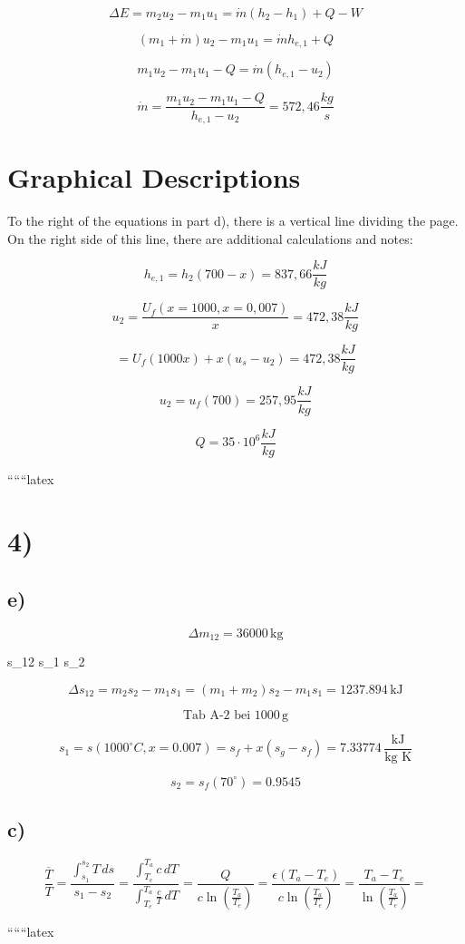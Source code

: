 \[
\Delta E = m_2 u_2 - m_1 u_1 = \dot{m} (h_2 - h_1) + Q - W
\]

\[
(m_1 + \dot{m}) u_2 - m_1 u_1 = \dot{m} h_{e,1} + Q
\]

\[
m_1 u_2 - m_1 u_1 - Q = \dot{m} (h_{e,1} - u_2)
\]

\[
\dot{m} = \frac{m_1 u_2 - m_1 u_1 - Q}{h_{e,1} - u_2} = 572,46 \frac{kg}{s}
\]

\section*{Graphical Descriptions}

To the right of the equations in part d), there is a vertical line dividing the page. On the right side of this line, there are additional calculations and notes:

\[
h_{e,1} = h_2 (700 - x) = 837,66 \frac{kJ}{kg}
\]

\[
u_2 = \frac{U_f (x = 1000, x = 0,007)}{x} = 472,38 \frac{kJ}{kg}
\]

\[
= U_f (1000 x) + x (u_s - u_2) = 472,38 \frac{kJ}{kg}
\]

\[
u_2 = u_f (700) = 257,95 \frac{kJ}{kg}
\]

\[
Q = 35 \cdot 10^6 \frac{kJ}{kg}
\]

``````latex

\section*{4)}

\subsection*{e)}
\[
\Delta m_{12} = 36000 \, \text{kg}
\]

 s_{12} s_{1} s_{2}

\[
\Delta s_{12} = m_2 s_2 - m_1 s_1 = (m_1 + m_2) s_2 - m_1 s_1 = 1237.894 \, \text{kJ}
\]

\[
\text{Tab A-2 bei } 1000 \, \text{g}
\]

\[
s_1 = s(1000^\circ C, x = 0.007) = s_f + x(s_g - s_f) = 7.33774 \, \frac{\text{kJ}}{\text{kg K}}
\]

\[
s_2 = s_f(70^\circ) = 0.9545
\]

\subsection*{c)}
\[
\frac{\overline{T}}{T} = \frac{\int_{s_1}^{s_2} T \, ds}{s_1 - s_2} = \frac{\int_{T_e}^{T_a} c \, dT}{\int_{T_e}^{T_a} \frac{c}{T} \, dT} = \frac{Q}{c \ln \left( \frac{T_a}{T_e} \right)} = \frac{\epsilon (T_a - T_e)}{c \ln \left( \frac{T_a}{T_e} \right)} = \frac{T_a - T_e}{\ln \left( \frac{T_a}{T_e} \right)} = 
\]

``````latex


